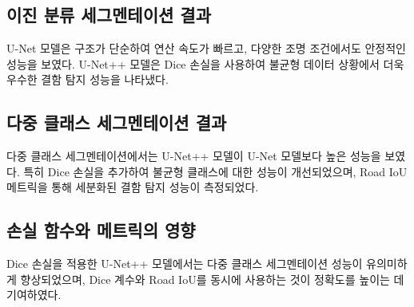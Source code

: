 \subsection{이진 분류 세그멘테이션 결과}
U-Net 모델은 구조가 단순하여 연산 속도가 빠르고, 다양한 조명 조건에서도 안정적인 성능을 보였다. U-Net++ 모델은 Dice 손실을 사용하여 불균형 데이터 상황에서 더욱 우수한 결함 탐지 성능을 나타냈다.

\subsection{다중 클래스 세그멘테이션 결과}
다중 클래스 세그멘테이션에서는 U-Net++ 모델이 U-Net 모델보다 높은 성능을 보였다. 특히 Dice 손실을 추가하여 불균형 클래스에 대한 성능이 개선되었으며, Road IoU 메트릭을 통해 세분화된 결함 탐지 성능이 측정되었다.

\subsection{손실 함수와 메트릭의 영향}
Dice 손실을 적용한 U-Net++ 모델에서는 다중 클래스 세그멘테이션 성능이 유의미하게 향상되었으며, Dice 계수와 Road IoU를 동시에 사용하는 것이 정확도를 높이는 데 기여하였다.

